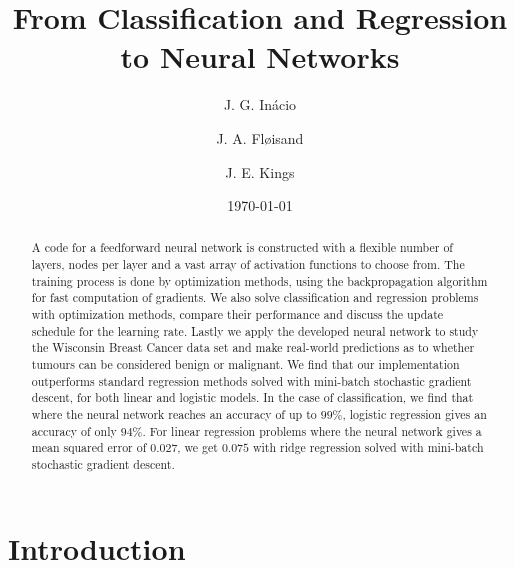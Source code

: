 \documentclass[aps,reprint,superscriptaddress,nofootinbib]{revtex4-2}
\begin{document}
\title{From Classification and Regression to Neural Networks}
\author{J. G. Inácio}
\author{J. A. Fløisand}
\author{J. E. Kings}
\date{\today}

\begin{abstract}
    A code for a feedforward neural network is constructed with a flexible number of layers, nodes per layer and a vast array of activation functions to choose from. The training process is done by optimization methods, using the backpropagation algorithm for fast computation of gradients. We also solve classification and regression problems with optimization methods, compare their performance and discuss the update schedule for the learning rate. Lastly we apply the developed neural network to study the Wisconsin Breast Cancer data set and make real-world predictions
    as to whether tumours can be considered benign or malignant. We find that our implementation outperforms standard regression methods solved with mini-batch stochastic gradient descent, for both linear and logistic models. In the case of classification, we find that where the neural network reaches an accuracy of up to \(99\%\), logistic regression gives an accuracy of only \(94\%\). For linear regression problems where the neural network gives a mean squared error of \(0.027\), we get \(0.075\) with ridge regression solved with mini-batch stochastic gradient descent.

\end{abstract}
\maketitle
\section*{Introduction}
\end{document}
